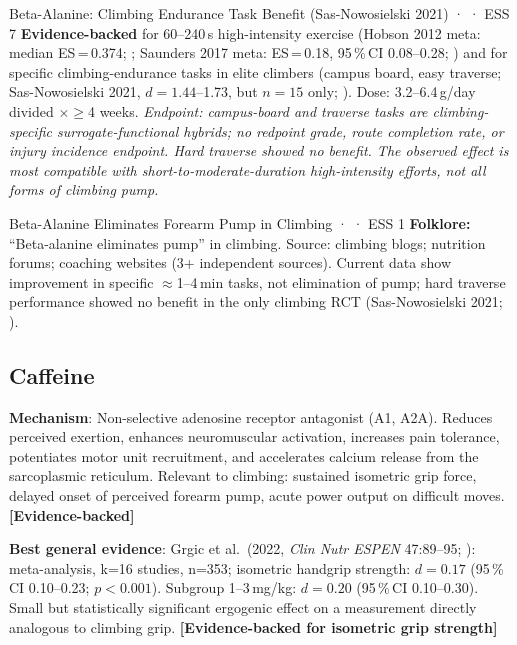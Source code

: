 \begin{evidencebox}{Beta-Alanine: Climbing Endurance Task Benefit (Sas-Nowosielski 2021) · \evidencebacked · ESS 7}
\textbf{Evidence-backed} for 60--240\,s high-intensity exercise (Hobson 2012 meta: median ES\,=\,0.374; \cite{HSB+12}; Saunders 2017 meta: ES\,=\,0.18, 95\,\%\,CI 0.08--0.28; \cite{SESA+16}) and for specific climbing-endurance tasks in elite climbers (campus board, easy traverse; Sas-Nowosielski 2021, $d = 1.44$--1.73, but $n{=}15$ only; \cite{SNWK21}). Dose: 3.2--6.4\,g/day divided $\times \geq$4 weeks. \textit{Endpoint: campus-board and traverse tasks are climbing-specific surrogate-functional hybrids; no redpoint grade, route completion rate, or injury incidence endpoint. Hard traverse showed no benefit. The observed effect is most compatible with short-to-moderate-duration high-intensity efforts, not all forms of climbing pump.}
\end{evidencebox}

\begin{folklorebox}{Beta-Alanine Eliminates Forearm Pump in Climbing · \folkloreverified · ESS 1}
\textbf{Folklore:} ``Beta-alanine eliminates pump'' in climbing. Source: climbing blogs; nutrition forums; coaching websites (3+ independent sources). Current data show improvement in specific ${\approx}$1--4\,min tasks, not elimination of pump; hard traverse performance showed no benefit in the only climbing RCT (Sas-Nowosielski 2021; \cite{SNWK21}).
\end{folklorebox}

\subsection{Caffeine}
\label{subsec:caffeine}

\textbf{Mechanism}: Non-selective adenosine receptor antagonist (A1, A2A). Reduces perceived exertion, enhances neuromuscular activation, increases pain tolerance, potentiates motor unit recruitment, and accelerates calcium release from the sarcoplasmic reticulum. Relevant to climbing: sustained isometric grip force, delayed onset of perceived forearm pump, acute power output on difficult moves. \textbf{[Evidence-backed]}

\textbf{Best general evidence}: Grgic et al.\ (2022, \textit{Clin Nutr ESPEN} 47:89--95; \cite{Grg22}): meta-analysis, k=16 studies, n=353; isometric handgrip strength: $d{=}0.17$ (95\,\%\,CI 0.10--0.23; $p{<}0.001$). Subgroup 1--3\,mg/kg: $d{=}0.20$ (95\,\%\,CI 0.10--0.30). Small but statistically significant ergogenic effect on a measurement directly analogous to climbing grip. \textbf{[Evidence-backed for isometric grip strength]}

